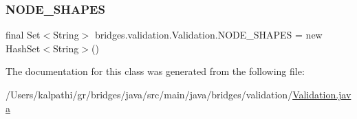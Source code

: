 \subsubsection{\texorpdfstring{NODE\_SHAPES}{NODE\_SHAPES}}
{\footnotesize\ttfamily final Set$<$String$>$ bridges.\+validation.\+Validation.\+N\+O\+D\+E\+\_\+\+S\+H\+A\+P\+ES = new Hash\+Set$<$String$>$()\hspace{0.3cm}{\ttfamily [static]}}



The documentation for this class was generated from the following file\+:\begin{DoxyCompactItemize}
\item 
/\+Users/kalpathi/gr/bridges/java/src/main/java/bridges/validation/\mbox{\hyperlink{_validation_8java}{Validation.\+java}}\end{DoxyCompactItemize}
